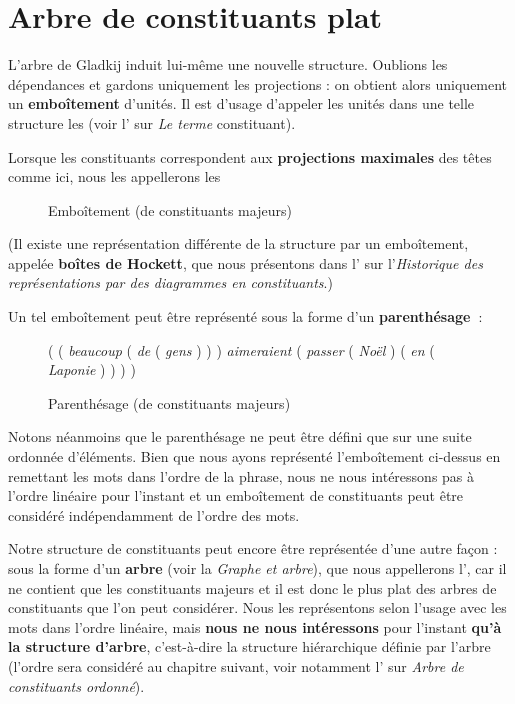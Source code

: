 \section{Arbre de constituants plat}\label{sec:3.4.2}

L’arbre de Gladkij induit lui-même une nouvelle structure. Oublions les dépendances et gardons uniquement les projections : on obtient alors uniquement un \textbf{emboîtement} d’unités. Il est d’usage d’appeler les unités dans une telle structure les  (voir l’ sur \textit{Le terme} constituant).

\begin{styleLivreImportant}
Lorsque les constituants correspondent aux \textbf{projections maximales} des têtes comme ici, nous les appellerons les 
\end{styleLivreImportant}

\begin{figure}

\caption{\label{fig:}Emboîtement (de constituants majeurs)}

\end{figure}

(Il existe une représentation différente de la structure par un emboîtement, appelée \textbf{boîtes de Hockett}, que nous présentons dans l’ sur l’\textit{Historique des représentations par des diagrammes en constituants}.)

Un tel emboîtement peut être représenté sous la forme d’un \textbf{parenthésage~}:

\begin{figure}
     ( ( \textit{beaucoup} ( \textit{de} ( \textit{gens} ) ) ) \textit{aimeraient} ( \textit{passer} ( \textit{Noël} ) ( \textit{en} ( \textit{Laponie} ) ) ) )
\caption{\label{fig:}Parenthésage (de constituants majeurs)}

\end{figure}

Notons néanmoins que le parenthésage ne peut être défini que sur une suite ordonnée d’éléments. Bien que nous ayons représenté l’emboîtement ci-dessus en remettant les mots dans l’ordre de la phrase, nous ne nous intéressons pas à l’ordre linéaire pour l’instant et un emboîtement de constituants peut être considéré indépendamment de l’ordre des mots.

Notre structure de constituants peut encore être représentée d’une autre façon : sous la forme d’un \textbf{arbre} (voir la  \textit{Graphe et arbre}), que nous appellerons l’, car il ne contient que les constituants majeurs et il est donc le plus plat des arbres de constituants que l’on peut considérer. Nous les représentons selon l’usage avec les mots dans l’ordre linéaire, mais \textbf{nous ne nous intéressons} pour l’instant \textbf{qu’à} \textbf{la structure d’arbre}, c’est-à-dire la structure hiérarchique définie par l’arbre (l’ordre sera considéré au chapitre suivant, voir notamment l’ sur \textit{Arbre de constituants ordonné}).

